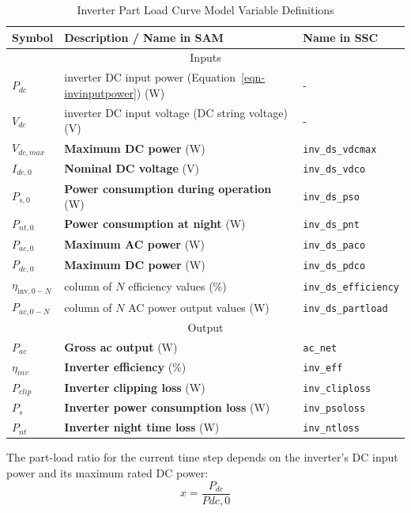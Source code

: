 \documentclass[12pt,letterpaper]{article}
\begin{document}
\begin{table}
\begin{center}
\caption{Inverter Part Load Curve Model Variable Definitions}
\begin{tabular}{lll}
\midrule
Symbol & Description / \textbf{Name in SAM} & Name in SSC \\
\midrule
\multicolumn{3}{c}{Inputs}\\
$P_{dc}$ & inverter DC input power (Equation~\ref{eqn-invinputpower}) (W)& - \\
$V_{dc}$ & inverter DC input voltage (DC string voltage) (V) & - \\
$V_{dc,max}$ & \textbf{Maximum DC power} (W)& \texttt{inv\_ds\_vdcmax} \\
$I_{dc,0}$ & \textbf{Nominal DC voltage} (V) & \texttt{inv\_ds\_vdco} \\
$P_{s,0}$ & \textbf{Power consumption during operation} (W)& \texttt{inv\_ds\_pso} \\
$P_{nt,0}$ & \textbf{Power consumption at night} (W)& \texttt{inv\_ds\_pnt} \\
$P_{ac,0}$ & \textbf{Maximum AC power} (W)& \texttt{inv\_ds\_paco} \\
$P_{dc,0}$ & \textbf{Maximum DC power} (W)& \texttt{inv\_ds\_pdco} \\
$\eta_{\mathrm{inv},0-N}$ & column of $N$ efficiency values (\%)& \texttt{inv\_ds\_efficiency} \\
$P_{ac,0-N}$ & column of $N$ AC power output values (W)& \texttt{inv\_ds\_partload} \\
\midrule
\multicolumn{3}{c}{Output}\\
$P_{ac}$ & \textbf{Gross ac output} (W)& \texttt{ac\_net} \\
$\eta_{inv}$ & \textbf{Inverter efficiency} (\%)& \texttt{inv\_eff}  \\
$P_{clip}$ & \textbf{Inverter clipping loss} (W)& \texttt{inv\_cliploss}  \\
$P_{s}$ & \textbf{Inverter power consumption loss} (W)& \texttt{inv\_psoloss}  \\
$P_{nt}$ & \textbf{Inverter night time loss} (W)& \texttt{inv\_ntloss}  \\
\hline
\end{tabular}
\label{tab-partloadinvertervars}
\end{center}
\end{table}

The part-load ratio for the current time step depends on the inverter's DC input power and its maximum rated DC power:
\begin{equation}
x = \frac{P_{dc}}{P{dc,0}}
\end{equation}
\end{document}

